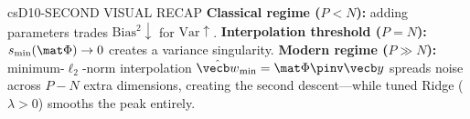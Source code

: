 \documentclass[../../../../master.tex]{subfiles}
\begin{document}
\begin{cscolumns}
\begin{cscard}{csD}{10-SECOND VISUAL RECAP}
  \sffamily\footnotesize
  \textbf{Classical regime ($P<N$):} adding parameters trades $\mathrm{Bias}^2\downarrow$ for $\mathrm{Var}\uparrow$.
  \textbf{Interpolation threshold ($P=N$):} $s_{\min}(\mat\Phi)\to 0$ creates a variance singularity.
  \textbf{Modern regime ($P\gg N$):} minimum-$\ell_2$-norm interpolation $\hat{\vecb w}_{\min}=\mat\Phi\pinv\vecb y$ spreads noise across $P-N$ extra dimensions, creating the second descent---while tuned Ridge ($\lambda>0$) smooths the peak entirely.
\end{cscard}
\end{cscolumns}

\csend
\end{document}
